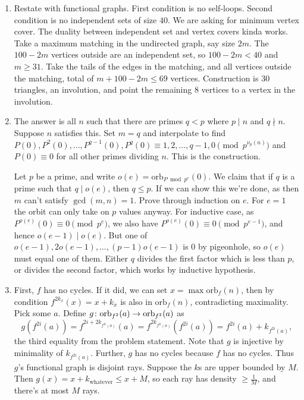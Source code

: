 \documentclass[11pt,paper=letter]{scrartcl}
\newcommand{\orbf}[2]{\mathrm{orb}_{#1}(#2)}
\begin{document}
\begin{enumerate}
\item Restate with functional graphs. First condition is no self-loops. Second condition is no independent sets of size $40$. We are asking for minimum vertex cover. The duality between independent set and vertex covers kinda works. Take a maximum matching in the undirected graph, say size $2m$. The $100 - 2m$ vertices outside are an independent set, so $100 - 2m < 40$ and $m \ge 31$. Take the tails of the edges in the matching, and all vertices outside the matching, total of $m + 100 - 2m \le 69$ vertices. Construction is $30$ triangles, an involution, and point the remaining $8$ vertices to a vertex in the involution.

\item The answer is all $n$ such that there are primes $q < p$ where $p \mid n$ and $q \nmid n$. Suppose $n$ satisfies this. Set $m = q$ and interpolate to find $P(0), P^2(0), \ldots, P^{q-1}(0), P^q(0) \equiv 1, 2, \ldots, q - 1, 0 \pmod{p^{\nu_p(n)}}$ and $P(0) \equiv 0$ for all other primes dividing $n$. This is the construction.

Let $p$ be a prime, and write $o(e) = \orbf{P \bmod p^e}{0}$. We claim that if $q$ is a prime such that $q \mid o(e)$, then $q \le p$. If we can show this we're done, as then $m$ can't satisfy $\gcd(m, n) = 1$. Prove through induction on $e$. For $e = 1$ the orbit can only take on $p$ values anyway. For inductive case, as $P^{o(e)}(0) \equiv 0 \pmod{p^e}$, we also have $P^{o(e)}(0) \equiv 0 \pmod{p^{e-1}}$, and hence $o(e-1) \mid o(e)$. But one of $o(e-1), 2o(e-1), \ldots, (p-1)o(e-1)$ is $0$ by pigeonhole, so $o(e)$ must equal one of them. Either $q$ divides the first factor which is less than $p$, or divides the second factor, which works by inductive hypothesis.

\item First, $f$ has no cycles. If it did, we can set $x = \max \orbf{f}{n}$, then by condition $f^{2k_x}(x) = x + k_x$ is also in $\orbf{f}{n}$, contradicting maximality. Pick some $a$. Define $g \from \orbf{f^2}{a} \to \orbf{f^2}{a}$ as \[
  g(f^{2i}(a)) = f^{2i + 2k_{f^{2i}(a)}}(a) = f^{2k_{f^{2i}(a)}}(f^{2i}(a)) = f^{2i}(a) + k_{f^{2i}(a)},
\]
the third equality from the problem statement. Note that $g$ is injective by minimality of $k_{f^{2i}(a)}$. Further, $g$ has no cycles because $f$ has no cycles. Thus $g$'s functional graph is disjoint rays. Suppose the $k$s are upper bounded by $M$. Then $g(x) = x + k_{\text{whatever}} \le x + M$, so each ray has density $\ge \frac{1}{M}$, and there's at most $M$ rays.


\end{enumerate}
\end{document}
